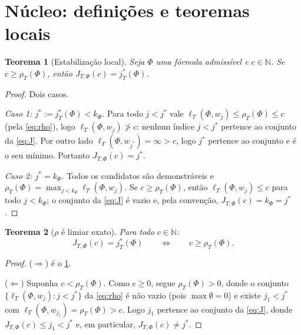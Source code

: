 \documentclass[11pt,a4paper]{article}
\newtheorem{theorem}{Teorema}[section]
\theoremstyle{definition}
\theoremstyle{remark}
\newcommand{\N}{\mathbb{N}}
\begin{document}
\section{N\'{u}cleo: defini\c{c}\~{o}es e teoremas locais}\label{sec:nucleo}

\begin{theorem}[Estabiliza\c{c}\~{a}o local]\label{thm:estabilizacao}
Seja $\Phi$ uma fórmula admissível e $c \in \N$. Se $c \geq \rho_T(\Phi)$, então
$J_{T,\Phi}(c) = j^{*}_{T}(\Phi)$.
\end{theorem}

\begin{proof}
Dois casos.

\emph{Caso 1: $j^{*} := j^{*}_{T}(\Phi) < k_\Phi$.} Para todo $j < j^{*}$ vale
$\ell_T(\Phi,w_j) \leq \rho_T(\Phi) \leq c$ (pela \cref{eq:rho}), logo
$\ell_T(\Phi,w_j) \ngtr c$: nenhum índice $j < j^{*}$ pertence ao conjunto da
\cref{eq:J}. Por outro lado $\ell_T(\Phi,w_{j^{*}}) = \infty > c$, logo $j^{*}$
pertence ao conjunto e é o seu mínimo. Portanto $J_{T,\Phi}(c) = j^{*}$.

\emph{Caso 2: $j^{*} = k_\Phi$.} Todos os candidatos são demonstráveis e
$\rho_T(\Phi) = \max_{j < k_\Phi} \ell_T(\Phi,w_j)$. Se $c \geq \rho_T(\Phi)$,
então $\ell_T(\Phi,w_j) \leq c$ para todo $j < k_\Phi$; o conjunto da
\cref{eq:J} é vazio e, pela convenção, $J_{T,\Phi}(c) = k_\Phi = j^{*}$.
\end{proof}

\begin{theorem}[$\rho$ \'{e} limiar exato]\label{thm:limiar-exato}
Para todo $c \in \N$:
\begin{equation}\label{eq:iff}
  J_{T,\Phi}(c) = j^{*}_{T}(\Phi) \qquad\iff\qquad c \geq \rho_T(\Phi).
\end{equation}
\end{theorem}

\begin{proof}
($\Rightarrow$) é o \cref{thm:estabilizacao}.

($\Leftarrow$) Suponha $c < \rho_T(\Phi)$. Como $c \geq 0$, segue
$\rho_T(\Phi) > 0$, donde o conjunto $\{ \ell_T(\Phi,w_j) : j < j^{*} \}$ da
\cref{eq:rho} é não vazio (pois $\max \emptyset = 0$) e existe
$j_1 < j^{*}$ com $\ell_T(\Phi,w_{j_1}) = \rho_T(\Phi) > c$. Logo $j_1$ pertence
ao conjunto da \cref{eq:J}, donde $J_{T,\Phi}(c) \leq j_1 < j^{*}$ e, em
particular, $J_{T,\Phi}(c) \neq j^{*}$.
\end{proof}
\end{document}
